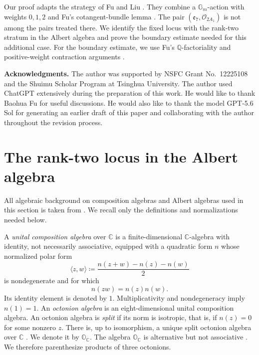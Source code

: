 \documentclass[12pt]{article}
\theoremstyle{definition}
\begin{document}
Our proof adapts the strategy of Fu and Liu
\cite[Lemma~4.1 and Proof of Theorem~4.2]{FuLiu}. They combine a
\(\mathbb G_m\)-action with weights \(0,1,2\) and Fu's cotangent-bundle lemma
\cite[Lemma~3.7]{FuSymplectic}. The pair
\((\mathfrak e_7,\mathcal O_{2A_1})\) is not among the pairs treated there. We
identify the fixed locus with the rank-two stratum in the Albert algebra
and prove the boundary estimate needed for this additional case. For the
boundary estimate, we use Fu's \(\mathbb Q\)-factoriality and
positive-weight contraction arguments
\cite[Proposition~4.4 and Proof of Lemma~4.3]{FuQFactorial}.

\vspace{0.8em}
\textbf{Acknowledgments.}
The author was supported by NSFC Grant No.~12225108 and the Shuimu
Scholar Program at Tsinghua University. The author used ChatGPT
extensively during the preparation of this work. He would like to
thank Baohua Fu for useful discussions. He
would also like to thank the model GPT-5.6 Sol for generating an earlier
draft of this paper and collaborating with the author throughout the
revision process.

\section{The rank-two locus in the Albert algebra}

All algebraic background on composition algebras and Albert algebras used in
this section is taken from
\cite[Sections~1.2--1.4, 1.6, 1.8, 5.1, and~5.2]{SV}. We recall only the
definitions and normalizations needed below.

A \emph{unital composition algebra} over \(\mathbb C\) is a finite-dimensional
\(\mathbb C\)-algebra with identity, not necessarily associative, equipped with a
quadratic form \(n\) whose normalized polar form
\[
    \langle z,w\rangle
    \coloneqq\frac{n(z+w)-n(z)-n(w)}2
\]
is nondegenerate and for which
\[
    n(zw)=n(z)n(w).
\]
Its identity element is denoted by \(1\). Multiplicativity and
nondegeneracy imply \(n(1)=1\). An \emph{octonion algebra} is an
eight-dimensional unital composition algebra. An octonion algebra is
\emph{split} if its norm is isotropic, that is, if \(n(z)=0\) for some
nonzero \(z\). There is, up to isomorphism, a unique split octonion algebra
over \(\mathbb C\)
\cite[Theorem~1.8.1]{SV}. We denote it by \(\mathbb O_{\mathbb C}\).
The algebra \(\mathbb O_{\mathbb C}\) is alternative but not associative
\cite[Lemma~1.4.2 and Theorem~1.6.2]{SV}. We therefore parenthesize products
of three octonions.
\end{document}

